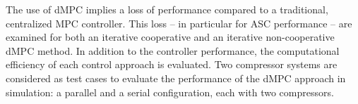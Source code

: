 The use of dMPC implies a loss of performance compared to a traditional, centralized MPC controller.
This loss -- in particular for ASC performance -- are examined for both an iterative cooperative and an iterative non-cooperative dMPC method.
In addition to the controller performance, the computational efficiency of each control approach is evaluated.
Two compressor systems are considered as test cases to evaluate the performance of the dMPC approach in simulation: a parallel and a serial configuration, each with two compressors.
